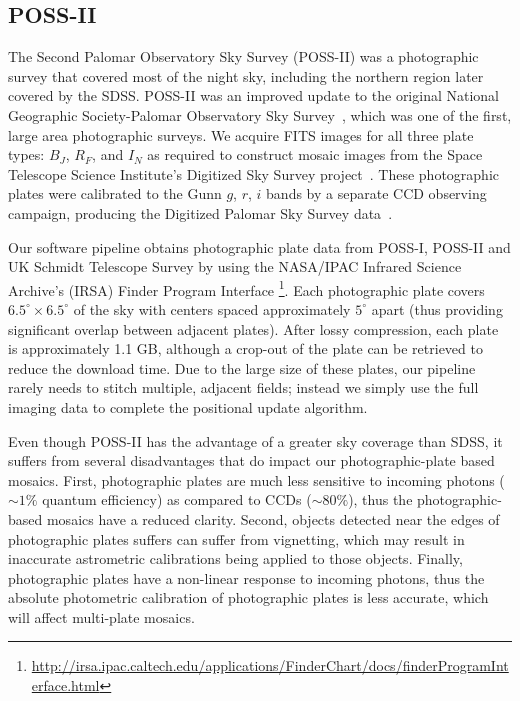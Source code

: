 \documentclass[authoryear, 12pt, 5p, times]{elsarticle}
\begin{document}
\subsection{POSS-II\label{POSSII}}
The Second Palomar Observatory Sky Survey (POSS-II) was a photographic survey that covered most of the night sky, including the northern region later covered by the SDSS. POSS-II was an improved update to the original National Geographic Society-Palomar Observatory Sky Survey~\citep[NGS-POSS or POSS-I;][]{ngs-poss}, which was one of the first, large area photographic surveys. We acquire FITS images for all three plate types: $B_J$, $R_F$, and $I_N$ as required to construct mosaic images from the Space Telescope Science Institute's Digitized Sky Survey project~\citep[DSS;][]{dss}.  These photographic plates were calibrated to the  Gunn $g$, $r$, $i$ bands by a separate CCD observing campaign, producing the Digitized Palomar Sky Survey data~\citep[DPOSS;][]{dposs}. 

Our software pipeline obtains photographic plate data from POSS-I, POSS-II and UK Schmidt Telescope Survey by using the NASA/IPAC Infrared Science Archive's (IRSA) Finder Program Interface \footnote{\url{http://irsa.ipac.caltech.edu/applications/FinderChart/docs/finderProgramInterface.html}}. Each photographic plate covers $6.5^{\circ} \times 6.5^{\circ}$ of the sky with centers spaced approximately $5^{\circ}$ apart (thus providing significant overlap between adjacent plates). After lossy compression, each plate is approximately 1.1 GB, although a crop-out of the plate can be retrieved to reduce the download time. Due to the large size of these plates, our pipeline rarely needs to stitch multiple, adjacent fields; instead we simply use the full imaging data to complete the positional update algorithm.

Even though POSS-II has the advantage of a greater sky coverage than SDSS, it suffers from several disadvantages that do impact our photographic-plate based mosaics. First, photographic plates are much less sensitive to incoming photons ($\sim1\%$ quantum efficiency) as compared to CCDs ($\sim80\%$), thus the photographic-based mosaics have a reduced clarity. Second, objects detected near the edges of photographic plates suffers can suffer from vignetting, which may result in inaccurate astrometric calibrations being applied to those objects. Finally, photographic plates have a non-linear response to incoming photons, thus the absolute photometric calibration of photographic plates is less accurate, which will affect multi-plate mosaics.
\end{document}
